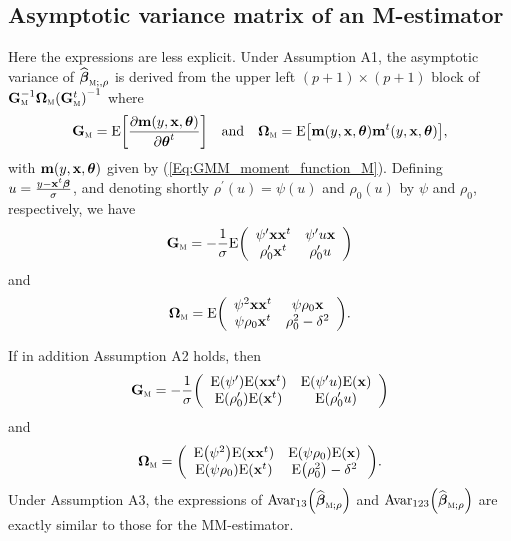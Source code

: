 \subsection{Asymptotic variance matrix of an M-estimator}

Here the expressions are less explicit. Under Assumption A1, the asymptotic
variance of $\sthat{\boldsymbol\beta}_{\stsc{M};,\rho}$ is derived from
the upper left $(p+1)\times(p+1)$ block of $\mathbf{G}_{\stsc{M}}%
^{-1}\boldsymbol{\Omega}_{\stsc{M}}\left(  \mathbf{G}_{\stsc{M}}%
^{t}\right)  ^{-1}$ where
\[
\mathbf{G}_{\stsc{M}}=\mathrm{E}\left[  \frac{\partial\mathbf{m}\left(
y,\stvec{x},\boldsymbol{\theta}\right)  }{\partial\boldsymbol{\theta}^{t}%
}\right]  \quad\text{and}\quad\boldsymbol{\Omega}_{\stsc{M}}=\mathrm{E}%
\left[  \mathbf{m}\left(  y,\stvec{x},\boldsymbol{\theta}\right)
\mathbf{m}^{t}\left(  y,\stvec{x},\boldsymbol{\theta}\right)  \right]  ,
\]
with $\mathbf{m}\left(  y,\stvec{x},\boldsymbol{\theta}\right)  $ given by
(\ref{Eq:GMM_moment_function_M}). Defining $u=\frac{y-\stvec{x}%
^{t}\boldsymbol\beta}{\sigma}$, and denoting shortly $\rho^{\prime}%
(u)=\psi(u)$ and $\rho_{0}(u)$ by $\psi$ and $\rho_{0}$, respectively, we
have
\[
\mathbf{G}_{\stsc{M}}=-\frac{1}{\sigma}\mathrm{E}\left(
\begin{array}
[c]{cc}%
\psi^{\prime}\mathbf{xx}^{t} & \psi^{\prime}u\stvec{x}\\
\rho_{0}^{\prime}\stvec{x}^{t} & \rho_{0}^{\prime}u
\end{array}
\right)
\]
and
\[
\boldsymbol{\Omega}_{\stsc{M}}=\mathrm{E}\left(
\begin{array}
[c]{cc}%
\psi^{2}\mathbf{xx}^{t} & \psi\rho_{0}\stvec{x}\\
\psi\rho_{0}\stvec{x}^{t} & \rho_{0}^{2}-\delta^{2}%
\end{array}
\right)  .
\]


If in addition Assumption A2 holds, then
\[
\mathbf{G}_{\stsc{M}}=-\frac{1}{\sigma}\left(
\begin{array}
[c]{cc}%
\mathrm{E}\left(  \psi^{\prime}\right)  \mathrm{E}\left(  \mathbf{xx}%
^{t}\right)  & \mathrm{E}\left(  \psi^{\prime}u\right)  \mathrm{E}\left(
\stvec{x}\right) \\
\mathrm{E}\left(  \rho_{0}^{\prime}\right)  \mathrm{E}\left(  \stvec{x}%
^{t}\right)  & \mathrm{E}\left(  \rho_{0}^{\prime}u\right)
\end{array}
\right)
\]
and
\[
\boldsymbol{\Omega}_{\stsc{M}}=\left(
\begin{array}
[c]{cc}%
\mathrm{E}\left(  \psi^{2}\right)  \mathrm{E}\left(  \mathbf{xx}^{t}\right)  &
\mathrm{E}\left(  \psi\rho_{0}\right)  \mathrm{E}\left(  \stvec{x}\right) \\
\mathrm{E}\left(  \psi\rho_{0}\right)  \mathrm{E}\left(  \stvec{x}^{t}\right)
& \mathrm{E}\left(  \rho_{0}^{2}\right)  -\delta^{2}%
\end{array}
\right)  .
\]
Under Assumption A3, the expressions of $\mathrm{Avar}_{13}\left(
\sthat{\boldsymbol\beta}_{\stsc{M};\rho}\right)  $ and $\mathrm{Avar}%
_{123}\left(  \sthat{\boldsymbol\beta}_{\stsc{M};\rho}\right)  $ are
exactly similar to those for the MM-estimator.


